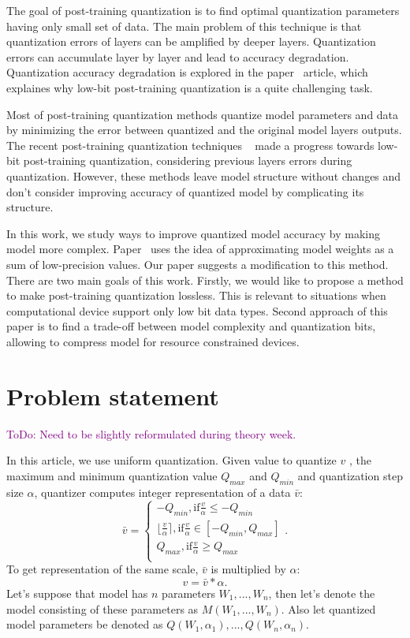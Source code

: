 \documentclass{article}
\newcommand{\TODO}[1]{\textcolor{purple}{ToDo: #1.}}
\begin{document}
The goal of post-training quantization is to find optimal quantization parameters having only small set of data. The main problem of this technique is that quantization errors of layers can be amplified by deeper layers.  Quantization errors can accumulate layer by layer and lead to accuracy degradation. Quantization accuracy degradation is explored in the paper~\cite{loss-aware-quantization} article, which explaines why  low-bit post-training quantization is a quite challenging task.  

Most of post-training quantization methods quantize model parameters and data by minimizing the error between quantized and the original model layers outputs. The recent post-training quantization techniques  ~\citep{adaquant, BreQ} made a progress towards low-bit post-training quantization, considering previous layers errors during quantization. However, these methods leave model structure 
without changes and don't consider improving accuracy of quantized model by complicating its structure.  

In this work, we study ways to improve quantized model accuracy by making model more complex. Paper~\citep{multiple_points} uses the idea of approximating model weights as a sum of low-precision values. Our paper suggests a modification to this method.  There are two main goals of this work. Firstly, we would like to propose a method to make post-training quantization lossless. This is relevant to situations when computational device support only low bit data types. Second approach of this paper is to find a trade-off between model complexity and quantization bits, allowing to compress model for resource constrained devices.  


\section{Problem statement}

\TODO{Need to be slightly reformulated during theory week}

\label{sec:headings}
In this article, we use uniform quantization. Given value to quantize $v$ , the maximum and minimum quantization value $Q_{max}$ and $Q_{min}$ and quantization step size $\alpha$, quantizer computes integer representation of a data $\bar{v}$:
$$
 \bar{v} =
\begin{cases}
    -Q_{min}, \text{if} \frac{v}{\alpha} \leq -Q_{min}\\
    \lfloor\frac{v}{\alpha}\rceil, \text{if} \frac{v}{\alpha} \in [-Q_{min}, Q_{max}]\\
    Q_{max}, \text{if} \frac{v}{\alpha} \geq Q_{max}\\
\end{cases}.
$$
To get representation of the same scale, $\bar{v}$ is multiplied by $\alpha$:
$$
\hat{v} = \bar{v} * \alpha.
$$
Let's suppose that model has $n$ parameters $W_1, ..., W_n $, then let's denote the model consisting of these parameters as $M(W_1, ..., W_n)$. 
Also let quantized model parameters be denoted as $Q(W_1, \alpha_1), ..., Q(W_n, \alpha_n)$.
\end{document}

